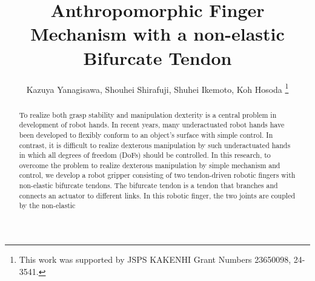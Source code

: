 \documentclass{llncs}
\begin{document}
\title{Anthropomorphic Finger Mechanism with a non-elastic Bifurcate Tendon}
\author{Kazuya Yanagisawa, Shouhei Shirafuji, Shuhei Ikemoto, Koh Hosoda
\thanks{This work was supported by JSPS KAKENHI Grant Numbers 23650098, 24-3541.}}
\maketitle

\begin{abstract}
	To realize both grasp
	stability and manipulation dexterity is a central
	problem in development of robot hands.
	In recent years, many underactuated robot hands have been developed to
	flexibly conform to an object's surface with %
	simple control.
	In contrast, it is difficult to realize dexterous manipulation 
	by such underactuated hands in which
	all degrees of freedom (DoFs) should be controlled.
	In this research, to overcome the problem to realize dexterous manipulation
	by simple mechanism and control,
	we develop a robot gripper consisting of two tendon-driven robotic fingers
	with non-elastic bifurcate tendons.
	The bifurcate tendon is a tendon that branches and connects an actuator
	to different links.
	In this robotic finger, the two joints are coupled by the non-elastic

\end{abstract}
\end{document}
